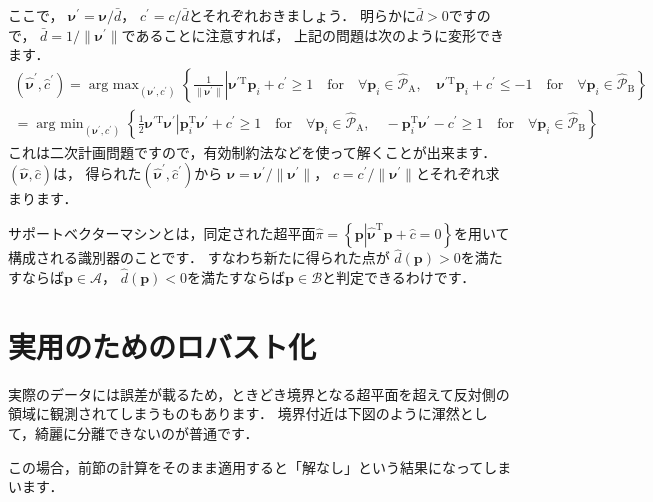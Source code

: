 ﻿\documentclass[a4paper]{jsarticle}
\begin{document}
ここで，
$\bm{\nu}^{\prime}=\bm{\nu}/\bar{d}$，
$c^{\prime}=c/\bar{d}$とそれぞれおきましょう．
明らかに$\bar{d}>0$ですので，
$\bar{d}=1/\|\bm{\nu}^{\prime}\|$であることに注意すれば，
上記の問題は次のように変形できます．
\begin{align*}
(\hat{\bm{\nu}}^{\prime},\hat{c}^{\prime})
=\mathop{\mathrm{arg~max}}_{(\bm{\nu}^{\prime},c^{\prime})}\left\{
\left.\frac{1}{\|\bm{\nu}^{\prime}\|}\right|
\bm{\nu}^{\prime\mathrm{T}}\bm{p}_{i}+c^{\prime}\geq 1\quad\mbox{for}\quad\forall\bm{p}_{i}\in\hat{\mathcal{P}}_{\mathrm{A}},\quad
\bm{\nu}^{\prime\mathrm{T}}\bm{p}_{i}+c^{\prime}\leq-1\quad\mbox{for}\quad\forall\bm{p}_{i}\in\hat{\mathcal{P}}_{\mathrm{B}}
\right\}
\\
=\mathop{\mathrm{arg~min}}_{(\bm{\nu}^{\prime},c^{\prime})}\left\{
\left.\frac{1}{2}\bm{\nu}^{\prime\mathrm{T}}\bm{\nu}^{\prime}\right|
\bm{p}_{i}^{\mathrm{T}}\bm{\nu}^{\prime}+c^{\prime}\geq 1\quad\mbox{for}\quad\forall\bm{p}_{i}\in\hat{\mathcal{P}}_{\mathrm{A}},\quad
-\bm{p}_{i}^{\mathrm{T}}\bm{\nu}^{\prime}-c^{\prime}\geq 1\quad\mbox{for}\quad\forall\bm{p}_{i}\in\hat{\mathcal{P}}_{\mathrm{B}}
\right\}
\end{align*}
これは二次計画問題ですので，有効制約法などを使って解くことが出来ます．
$(\hat{\bm{\nu}},\hat{c})$は，
得られた$(\hat{\bm{\nu}}^{\prime},\hat{c}^{\prime})$から
$\bm{\nu}=\bm{\nu}^{\prime}/\|\bm{\nu}^{\prime}\|$，
$c=c^{\prime}/\|\bm{\nu}^{\prime}\|$とそれぞれ求まります．

サポートベクターマシンとは，同定された超平面$\hat{\pi}=\left\{\bm{p}\left|\hat{\bm{\nu}}^{\mathrm{T}}\bm{p}+\hat{c}=0\right.\right\}$を用いて構成される識別器のことです．
すなわち新たに得られた点が
$\hat{d}(\bm{p})>0$を満たすならば$\bm{p}\in\mathcal{A}$，
$\hat{d}(\bm{p})<0$を満たすならば$\bm{p}\in\mathcal{B}$と判定できるわけです．


\section{実用のためのロバスト化}

実際のデータには誤差が載るため，ときどき境界となる超平面を超えて反対側の領域に観測されてしまうものもあります．
境界付近は下図のように渾然として，綺麗に分離できないのが普通です．

\begin{figure}[h]
\centering

\end{figure}

この場合，前節の計算をそのまま適用すると「解なし」という結果になってしまいます．
\end{document}
